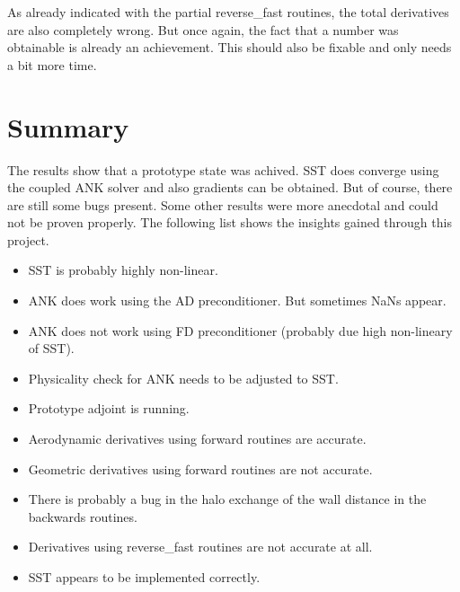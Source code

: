 As already indicated with the partial reverse\_fast routines, the total
derivatives are also completely wrong. But once again, the fact that a number
was obtainable is already an achievement. This should also be fixable and only
needs a bit more time.








\section{Summary}
The results show that a prototype state was achived. SST does converge using
the coupled ANK solver and also gradients can be obtained. But of course, there
are still some bugs present. Some other results were more anecdotal and could
not be proven properly. The following list shows the insights gained through
this project.

\begin{itemize}
    \item SST is probably highly non-linear.

    \item ANK does work using the AD preconditioner. But sometimes NaNs appear.

    \item ANK does not work using FD preconditioner (probably due high
        non-lineary of SST).

    \item Physicality check for ANK needs to be adjusted to SST.

    \item Prototype adjoint is running.

    \item Aerodynamic derivatives using forward routines are accurate.

    \item Geometric derivatives using forward routines are not accurate.

    \item There is probably a bug in the halo exchange of the wall distance in
        the backwards routines.

    \item Derivatives using reverse\_fast routines are not accurate at all.

    \item SST appears to be implemented correctly.
\end{itemize}

